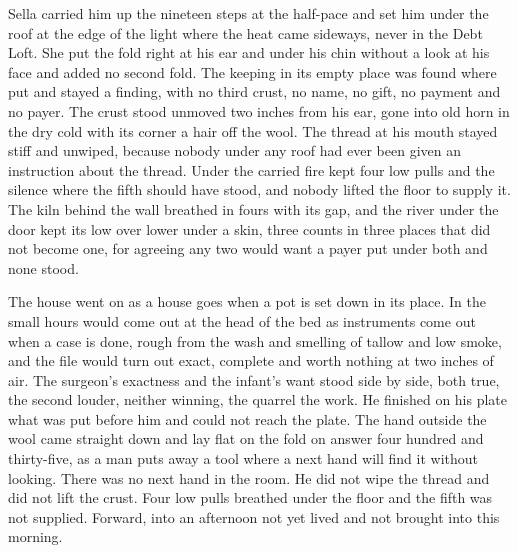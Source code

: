 Sella carried him up the nineteen steps at the half-pace and set him under the roof at the edge of the light where the heat came sideways, never in the Debt Loft. She put the fold right at his ear and under his chin without a look at his face and added no second fold. The keeping in its empty place was found where put and stayed a finding, with no third crust, no name, no gift, no payment and no payer. The crust stood unmoved two inches from his ear, gone into old horn in the dry cold with its corner a hair off the wool. The thread at his mouth stayed stiff and unwiped, because nobody under any roof had ever been given an instruction about the thread. Under  the carried fire kept four low pulls and the silence where the fifth should have stood, and nobody lifted the floor to supply it. The kiln behind the wall breathed in fours with its gap, and the river under the door kept its low over lower under a skin, three counts in three places that did not become one, for agreeing any two would want a payer put under both and none stood.

The house went on as a house goes when a pot is set down in its place. In the small hours  would come out at the head of the bed as instruments come out when a case is done, rough from the wash and smelling of tallow and low smoke, and the file would turn out exact, complete and worth nothing at two inches of air. The surgeon's exactness and the infant's want stood side by side, both true, the second louder, neither winning, the quarrel the work. He finished on his plate what was put before him and could not reach the plate. The hand outside the wool came straight down and lay flat on the fold on answer four hundred and thirty-five, as a man puts away a tool where a next hand will find it without looking. There was no next hand in the room. He did not wipe the thread and did not lift the crust. Four low pulls breathed under the floor and the fifth was not supplied. Forward, into an afternoon not yet lived and not brought into this morning.
